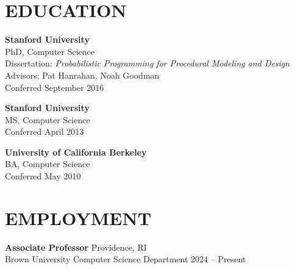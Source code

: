 \documentclass[line,margin]{res}
\begin{document}
\address{ \url{dritchie.github.io} $\cdot$ \url{daniel_ritchie@brown.edu} }
 
\begin{resume}


 
\section{EDUCATION}
\textbf{Stanford University} \\
PhD, Computer Science \\
Dissertation: \emph{Probabilistic Programming for Procedural Modeling and Design} \\
Advisors: Pat Hanrahan, Noah Goodman \\
Conferred September 2016

\textbf{Stanford University} \\
MS, Computer Science \\
Conferred April 2013

\textbf{University of California Berkeley} \\
BA, Computer Science \\
Conferred May 2010


\section{EMPLOYMENT}

\newcommand{\job}[4] {
	\textbf{#1} \hfill #3\\
	#2 \hfill #4
}

\job
{Associate Professor}
{Brown University Computer Science Department}
{Providence, RI}
{2024 -- Present}


\end{resume}
\end{document}
